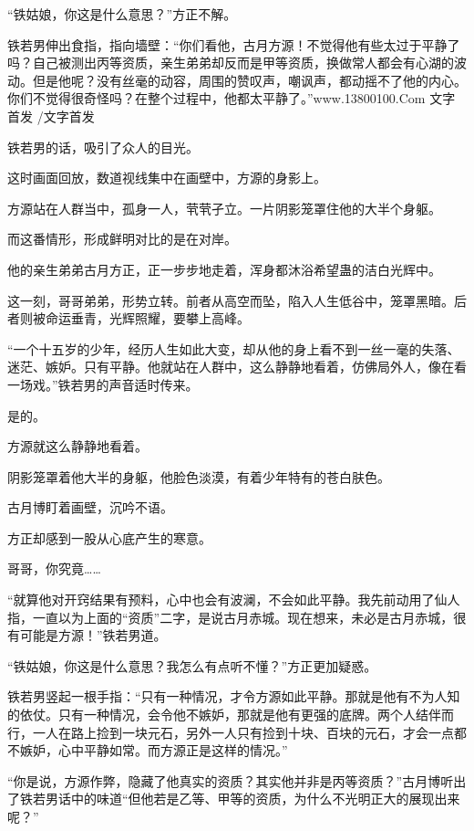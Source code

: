 
\begin{this_body}

“铁姑娘，你这是什么意思？”方正不解。

铁若男伸出食指，指向墙壁：“你们看他，古月方源！不觉得他有些太过于平静了吗？自己被测出丙等资质，亲生弟弟却反而是甲等资质，换做常人都会有心湖的波动。但是他呢？没有丝毫的动容，周围的赞叹声，嘲讽声，都动摇不了他的内心。你们不觉得很奇怪吗？在整个过程中，他都太平静了。”www.13800100.Com 文字首发 /文字首发

铁若男的话，吸引了众人的目光。

这时画面回放，数道视线集中在画壁中，方源的身影上。

方源站在人群当中，孤身一人，茕茕孑立。一片阴影笼罩住他的大半个身躯。

而这番情形，形成鲜明对比的是在对岸。

他的亲生弟弟古月方正，正一步步地走着，浑身都沐浴希望蛊的洁白光辉中。

这一刻，哥哥弟弟，形势立转。前者从高空而坠，陷入人生低谷中，笼罩黑暗。后者则被命运垂青，光辉照耀，要攀上高峰。

“一个十五岁的少年，经历人生如此大变，却从他的身上看不到一丝一毫的失落、迷茫、嫉妒。只有平静。他就站在人群中，这么静静地看着，仿佛局外人，像在看一场戏。”铁若男的声音适时传来。

是的。

方源就这么静静地看着。

阴影笼罩着他大半的身躯，他脸色淡漠，有着少年特有的苍白肤色。

古月博盯着画壁，沉吟不语。

方正却感到一股从心底产生的寒意。

哥哥，你究竟……

“就算他对开窍结果有预料，心中也会有波澜，不会如此平静。我先前动用了仙人指，一直以为上面的“资质”二字，是说古月赤城。现在想来，未必是古月赤城，很有可能是方源！”铁若男道。

“铁姑娘，你这是什么意思？我怎么有点听不懂？”方正更加疑惑。

铁若男竖起一根手指：“只有一种情况，才令方源如此平静。那就是他有不为人知的依仗。只有一种情况，会令他不嫉妒，那就是他有更强的底牌。两个人结伴而行，一人在路上捡到一块元石，另外一人只有捡到十块、百块的元石，才会一点都不嫉妒，心中平静如常。而方源正是这样的情况。”

“你是说，方源作弊，隐藏了他真实的资质？其实他并非是丙等资质？”古月博听出了铁若男话中的味道“但他若是乙等、甲等的资质，为什么不光明正大的展现出来呢？”


\end{this_body}
